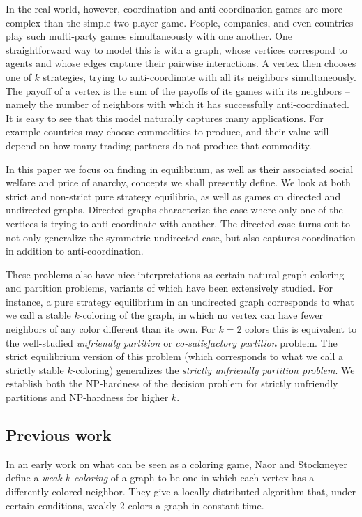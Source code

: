\documentclass{llncs}
\begin{document}
In the real world, however, coordination and anti-coordination games are more
complex than the simple two-player game.  People, companies, and even countries
play such multi-party games simultaneously with one another. One straightforward
way to model this is with a graph, whose vertices correspond to agents and whose
edges capture their pairwise interactions.  A vertex then chooses one of $k$
strategies, trying to anti-coordinate with all its neighbors simultaneously.
The payoff of a vertex is the sum of the payoffs of its games with its neighbors
-- namely the number of neighbors with which it has successfully
anti-coordinated.  It is easy to see that this model naturally captures many
applications.  For example countries may choose commodities to produce, and
their value will depend on how many trading partners do not produce that
commodity.

In this paper we focus on finding  in equilibrium, as well
as their associated social welfare and price of anarchy, concepts we shall
presently define.  We look at both strict and non-strict  pure strategy
equilibria, as well as games on directed and undirected graphs.  Directed graphs
characterize the case where only one of the vertices is trying to
anti-coordinate with another.  The directed case turns out to not only
generalize the symmetric undirected case, but also captures coordination in
addition to anti-coordination.

These problems also have nice interpretations as certain natural graph coloring
and partition problems, variants of which have been extensively studied.  For
instance, a pure strategy equilibrium in an undirected graph corresponds to what
we call a stable $k$-coloring of the graph, in which no vertex can have fewer
neighbors of any color different than its own.  For $k=2$ colors this is
equivalent to the well-studied \emph{unfriendly partition} or
\emph{co-satisfactory partition} problem.  The strict equilibrium version of
this problem (which corresponds to what we call a strictly stable $k$-coloring)
generalizes the \emph{strictly unfriendly partition problem}. We establish both
the NP-hardness of the decision problem for strictly unfriendly partitions and
NP-hardness for higher $k$.


\subsection{Previous work}
In an early work on what can be seen as a coloring game, Naor and
Stockmeyer~\cite{NaorS93} define a \emph{weak $k$-coloring} of a graph to be one
in which each vertex has a differently colored neighbor.  They give a locally
distributed algorithm that, under certain conditions, weakly $2$-colors a graph
in constant time. 
\end{document}
